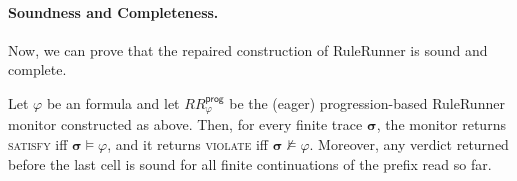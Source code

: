 \paragraph{Soundness and Completeness.}
Now, we can prove that the repaired construction of RuleRunner is sound and complete.

\begin{theorem}
\label{thm:rulerunner-progression-correct}
Let $\varphi$ be an \ltlf formula and let $RR^{\mathsf{prog}}_\varphi$ be the (eager) progression-based RuleRunner monitor constructed as above. Then, for every finite  trace $\boldsymbol{\sigma}$, the monitor returns \textsc{satisfy} iff $\boldsymbol{\sigma}\models\varphi$, and it returns \textsc{violate} iff $\boldsymbol{\sigma}\not\models\varphi$. Moreover, any verdict returned before the last cell is sound for all finite continuations of the prefix read so far.
\end{theorem}

